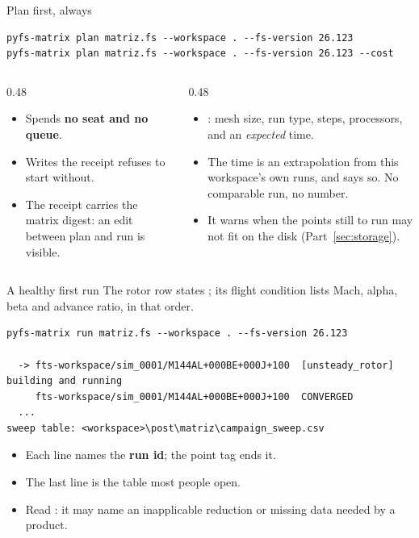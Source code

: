 \begin{frame}[fragile]{Plan first, always}
\begin{lstlisting}[style=ftsbase]
pyfs-matrix plan matriz.fs --workspace . --fs-version 26.123
pyfs-matrix plan matriz.fs --workspace . --fs-version 26.123 --cost
\end{lstlisting}
\begin{columns}[T]
\begin{column}{0.48\textwidth}
\begin{itemize}
  \item Spends \textbf{no seat and no queue}.
  \item Writes the receipt  refuses to start without.
  \item The receipt carries the matrix digest: an edit between plan and run
        is visible.
\end{itemize}
\end{column}
\begin{column}{0.48\textwidth}
\begin{itemize}
  \item {}: mesh size, run type, steps, processors, and an
        \emph{expected} time.
  \item The time is an extrapolation from this workspace's own runs, and says
        so. No comparable run, no number.
  \item It warns when the points still to run may not fit on the disk
        (Part~\ref{sec:storage}).
\end{itemize}
\end{column}
\end{columns}
\end{frame}

\begin{frame}[fragile]{A healthy first run}
\small The rotor row states ; its flight condition
lists Mach, alpha, beta and advance ratio, in that order.
\begin{lstlisting}[style=ftsbase]
pyfs-matrix run matriz.fs --workspace . --fs-version 26.123

  -> fts-workspace/sim_0001/M144AL+000BE+000J+100  [unsteady_rotor]  building and running
     fts-workspace/sim_0001/M144AL+000BE+000J+100  CONVERGED
  ...
sweep table: <workspace>\post\matriz\campaign_sweep.csv
\end{lstlisting}
\begin{itemize}
  \item Each line names the \textbf{run id}; the point tag ends it.
  \item The last line is the table most people open.
  \item Read : it may name an inapplicable reduction or missing
        data needed by a product.
\end{itemize}
\end{frame}

